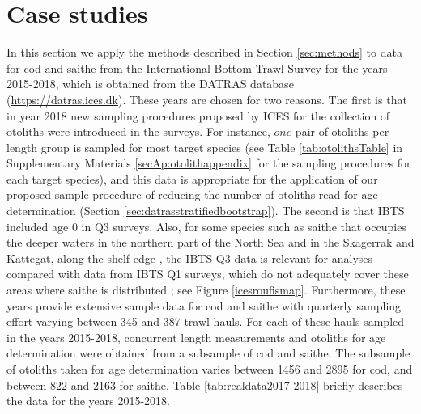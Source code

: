 \documentclass[a4paper 12pt]{article}
\numberwithin{equation}{section}
\begin{document}
\section{Case studies}
\label{sec:data}
In this section we apply the methods described in Section \ref{sec:methods} to data for cod and saithe from the International Bottom Trawl Survey for the years 2015-2018, which is obtained from the DATRAS database (\href{https://datras.ices.dk}{https://datras.ices.dk}). These years are chosen for two reasons. The first is that in year 2018 new sampling procedures proposed by ICES for the collection of otoliths were introduced in the surveys. For instance, $one$ pair of otoliths per length group is sampled for most target species (see Table \ref{tab:otolithsTable} in Supplementary Materials \ref{secAp:otolithappendix} for the sampling procedures for each target species), and this data is appropriate for the application of our proposed sample procedure of reducing the number of otoliths read for age determination (Section \ref{sec:datrasstratifiedbootstrap}). The second is that IBTS included age 0 in Q3 surveys. Also, for some species such as saithe that occupies the deeper waters in the northern part of the North Sea and in the Skagerrak and Kattegat, along the shelf edge \citep{ICESFishMaps}, the IBTS Q3 data is relevant for analyses compared with data from IBTS Q1 surveys, which do not adequately cover these areas where saithe is distributed \citep{ICESJune2016}; see Figure \ref{icesroufismap}. Furthermore, these years provide extensive sample data for cod and saithe with quarterly sampling effort varying between 345 and 387 trawl hauls. For each of these hauls sampled in the years 2015-2018, concurrent length measurements and otoliths for age determination were obtained from a subsample of cod and saithe. The subsample of otoliths taken for age determination varies between 1456 and 2895 for cod, and between 822 and 2163 for saithe. Table \ref{tab:realdata2017-2018} briefly describes the data for the years 2015-2018.\\
\end{document}
